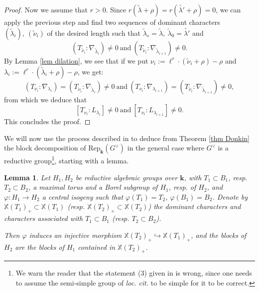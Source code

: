 \documentclass[11pt]{amsart}
\theoremstyle{plain}
\newtheorem{lem}[thm]{Lemma}
\theoremstyle{remark}
\numberwithin{equation}{section}
\begin{document}
\begin{proof}
		Now we assume that $r>0$. Since $r(\tilde{\lambda}+\rho)=r(\tilde{\lambda'}+\rho)=0$, we can apply the previous step and find two sequences of dominant characters $(\tilde{\lambda}_i),~(\tilde{\nu}_i)$ of the desired length such that $\tilde{\lambda}_s=\tilde{\lambda},~\tilde{\lambda}_0=\tilde{\lambda'}$ and 
		$$(T_{\tilde{\nu}_i}:\nabla_{\tilde{\lambda}_i})\neq0~\text{and}~(T_{\tilde{\nu}_i}:\nabla_{\tilde{\lambda}_{i+1}})\neq0. $$
		By Lemma \ref{lem dilation}, we see that if we put $\nu_i:=\ell^r\cdot(\tilde{\nu}_i+\rho)-\rho$ and $\lambda_i:=\ell^r\cdot(\tilde{\lambda}_i+\rho)-\rho$, we get:
		$$(T_{\nu_i}:\nabla_{\lambda_i})=(T_{\tilde{\nu}_i}:\nabla_{\tilde{\lambda}_i})\neq0~\text{and}~(T_{\nu_i}:\nabla_{\lambda_{i+1}})=(T_{\tilde{\nu}_i}:\nabla_{\tilde{\lambda}_{i+1}})\neq0, $$
		from which we deduce that
		$$[T_{\nu_i}:L_{\lambda_i}]\neq0~\text{and}~[T_{\nu_i}:L_{\lambda_{i+1}}]\neq0. $$
		This concludes the proof.
	\end{proof}
We will now use the process described in  \cite[§II.7.3]{jantzen2003representations} to deduce from Theorem \ref{thm Donkin} the block decomposition of $\mathrm{Rep}_\mathbf{k}(G^\vee)$ in the general case where $G^\vee$ is a reductive group\footnote{We warn the reader that the statement (3) given in \cite[§II.7.3]{jantzen2003representations} is wrong, since one needs to assume the semi-simple group of \textit{loc. cit.} to be simple for it to be correct.}, starting with a lemma.
	\begin{lem}\label{central extension}
		Let $H_1,H_2$ be reductive algebraic groups over $\mathbf{k}$, with $T_1\subset B_1$, resp. $T_2\subset B_2$, a maximal torus and a Borel subgroup of $H_1$, resp. of $H_2$, and $\varphi:H_1\to H_2$ a central isogeny such that $\varphi(T_1)=T_2$, $\varphi(B_1)=B_2$. Denote by $\mathbb{X}(T_1)_+\subset\mathbb{X}(T_1)$ (resp. $\mathbb{X}(T_2)_+\subset\mathbb{X}(T_2)$) the dominant characters and characters associated with $T_1\subset B_1$ (resp. $T_2\subset B_2$). 
		
		Then $\varphi$ induces an injective morphism  $\mathbb{X}(T_2)_+\hookrightarrow\mathbb{X}(T_1)_+$, and the blocks of $H_2$ are the blocks of $H_1$ contained in $\mathbb{X}(T_2)_+$.
	\end{lem}
\end{document}
